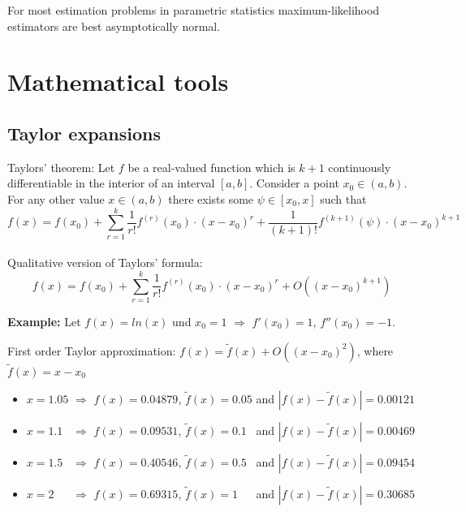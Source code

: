 \documentclass[
]{book}
\providecommand{\tightlist}{%
  \setlength{\itemsep}{0pt}\setlength{\parskip}{0pt}}
\begin{document}
\hfill\break

For most estimation problems in parametric statistics maximum-likelihood estimators are best asymptotically normal.

\hypertarget{mathematical-tools}{%
\section{Mathematical tools}\label{mathematical-tools}}

\hypertarget{taylor-expansions}{%
\subsection{Taylor expansions}\label{taylor-expansions}}

Taylors' theorem: Let \(f\) be a real-valued function which is
\(k+1\) continuously differentiable in the interior of an interval \([a,b]\). Consider a point
\(x_0\in (a,b)\). For any other value \(x\in (a,b)\) there exists some \(\psi\in [x_0,x]\) such that
\[f(x)=f(x_0)+\sum_{r=1}^k \frac{1}{r!}f^{(r)}(x_0)\cdot(x-x_0)^r+\frac{1}{(k+1)!}f^{(k+1)}(\psi)\cdot(x-x_0)^{k+1}\]\\

Qualitative version of Taylors' formula:
\[f(x)=f(x_0)+\sum_{r=1}^k \frac{1}{r!}f^{(r)}(x_0)\cdot(x-x_0)^r+O((x-x_0)^{k+1})\]

\hfill\break

\textbf{Example:} Let \(f(x)=ln(x)\) und \(x_0=1\) \(\Rightarrow\) \(f'(x_0)=1\), \(f''(x_0)=-1\).

\hfill\break

First order Taylor approximation: \(f(x)=\tilde f(x)+O((x-x_0)^{2})\), where \(\tilde f(x)=x-x_0\)

\begin{itemize}
\tightlist
\item
  \(x=1.05\) \(\Rightarrow\) \(f(x)=0.04879\), \(\tilde f(x)=0.05\) and \(|f(x)-\tilde f(x)|=0.00121\)
\item
  \(x=1.1\phantom{0}\) \(\Rightarrow\) \(f(x)=0.09531\), \(\tilde f(x)=0.1\phantom{0}\) and \(|f(x)-\tilde f(x)|=0.00469\)
\item
  \(x=1.5\phantom{0}\) \(\Rightarrow\) \(f(x)=0.40546\), \(\tilde f(x)=0.5\phantom{0}\) and \(|f(x)-\tilde f(x)|=0.09454\)
\item
  \(x=2\phantom{.00}\) \(\Rightarrow\) \(f(x)=0.69315\), \(\tilde f(x)=1\phantom{.00}\) and \(|f(x)-\tilde f(x)|=0.30685\)
\end{itemize}
\end{document}

